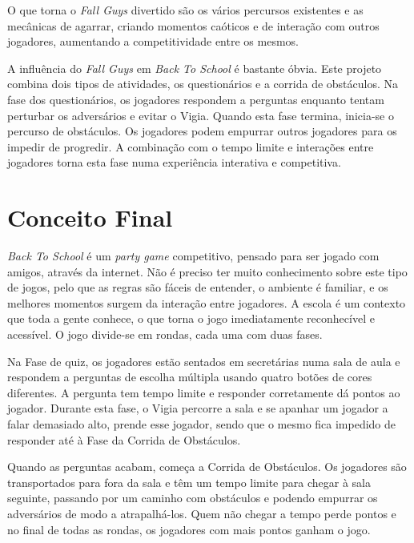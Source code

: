 O que torna o \textit{Fall Guys} divertido são os vários percursos existentes e as mecânicas de agarrar, criando momentos caóticos e de interação com outros jogadores, aumentando a competitividade entre os mesmos.

A influência do \textit{Fall Guys} em \textit{Back To School} é bastante óbvia. Este projeto combina dois tipos de atividades, os questionários e a corrida de obstáculos. Na fase dos questionários, os jogadores respondem a perguntas enquanto tentam perturbar os adversários e evitar o Vigia. Quando esta fase termina, inicia-se o percurso de obstáculos. Os jogadores podem empurrar outros jogadores para os impedir de progredir. A combinação com o tempo limite e interações entre jogadores torna esta fase numa experiência interativa e competitiva.


\section{Conceito Final}
\label{sec:conceitoFinal}

\textit{Back To School} é um \textit{party game} competitivo, pensado para ser jogado com amigos, através da internet. Não é preciso ter muito conhecimento sobre este tipo de jogos, pelo que as regras são fáceis de entender, o ambiente é familiar, e os melhores momentos surgem da interação entre jogadores. A escola é um contexto que toda a gente conhece, o que torna o jogo imediatamente reconhecível e acessível. O jogo divide-se em rondas, cada uma com duas fases.

Na Fase de quiz, os jogadores estão sentados em secretárias numa sala de aula e respondem a perguntas de escolha múltipla usando quatro botões de cores diferentes. A pergunta tem tempo limite e responder corretamente dá pontos ao jogador. Durante esta fase, o Vigia percorre a sala e se apanhar um jogador a falar demasiado alto, prende esse jogador, sendo que o mesmo fica impedido de responder até à Fase da Corrida de Obstáculos.

Quando as perguntas acabam, começa a Corrida de Obstáculos. Os jogadores são transportados para fora da sala e têm um tempo limite para chegar à sala seguinte, passando por um caminho com obstáculos e podendo empurrar os adversários de modo a atrapalhá-los. Quem não chegar a tempo perde pontos e no final de todas as rondas, os jogadores com mais pontos ganham o jogo.




